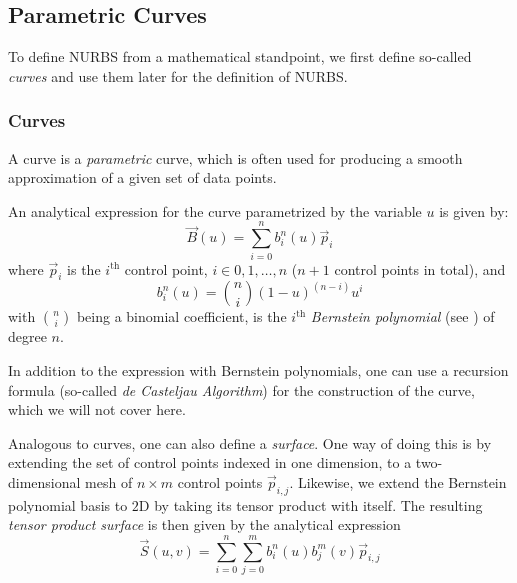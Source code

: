 \subsection{Parametric Curves}
\label{subsec:paracurves}

To define NURBS from a mathematical standpoint, we first define so-called \emph{\Bez curves} and use them later for the definition of NURBS. 
\subsubsection{\Bez Curves}
\label{subsub:bezcurvsurf}
A \Bez curve is a \textit{parametric} curve, which is often used for producing a smooth approximation of a given set of data points.
 
An analytical expression for the \Bez curve parametrized by the variable $u$ is given by:
\begin{equation}
\label{eq:beziercurve}
\vec{B}(u)=\sum\limits_{i=0}^n b_i^n(u) \vec{p}_i
\end{equation}
where $\vec{p}_i$ is the $i^{\text{th}}$ control point, $i\in0,1, \dots ,n$ ($n+1$ control points in total), and
\begin{equation*}
b_i^n(u)=\binom{n}{i}(1-u)^{(n-i)}u^i
\end{equation*}
with $\binom{n}{i}$ being a binomial coefficient, is the $i^{\text{th}}$ \emph{Bernstein polynomial} (see \cite{lorentz2012bernstein}) of degree $n$.

In addition to the expression with Bernstein polynomials, one can use a recursion formula (so-called \emph{de Casteljau Algorithm}) for the construction of the \Bez curve, which we will not cover here. 

Analogous to \Bez curves, one can also define a \textit{\Bez surface}. One way of doing this is by extending the set of control points indexed in one dimension, to a two-dimensional mesh of $n\times m$ control points $\vec{p}_{i,j}$. Likewise, we extend the Bernstein polynomial basis to $2$D by taking its tensor product with itself. The resulting \textit{tensor product \Bez surface} is then given by the analytical expression
\begin{equation}
\label{eq:bezsurface}
\vec{S}(u,v)=\sum\limits_{i=0}^n \sum\limits_{j=0}^m b_i^n(u) b_j^m(v) \vec{p}_{i,j}
\end{equation}

